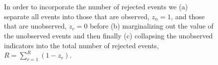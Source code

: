 \documentclass[
  letterpaper,
  DIV=11,
  numbers=noendperiod]{scrartcl}
\begin{document}
\begin{figure}
\begin{minipage}{0.50\linewidth}
{}

\subcaption{\label{fig-rejection-two}}

\end{minipage}%
\newline
\begin{minipage}{0.25\linewidth}
~\end{minipage}%
%
\begin{minipage}{0.50\linewidth}


\subcaption{\label{fig-rejection-three}}

\end{minipage}%
%
\begin{minipage}{0.25\linewidth}
~\end{minipage}%

\caption{\label{fig-rejection}In order to incorporate the number of
rejected events we (a) separate all events into those that are observed,
\(z_{n} = 1\), and those that are unobserved, \(z_{r} = 0\) before (b)
marginalizing out the value of the unobserved events and then finally
(c) collapsing the unobserved indicators into the total number of
rejected events, \(R = \sum_{r = 1}^{R} (1 - z_{r})\).}

\end{figure}%
\end{document}
